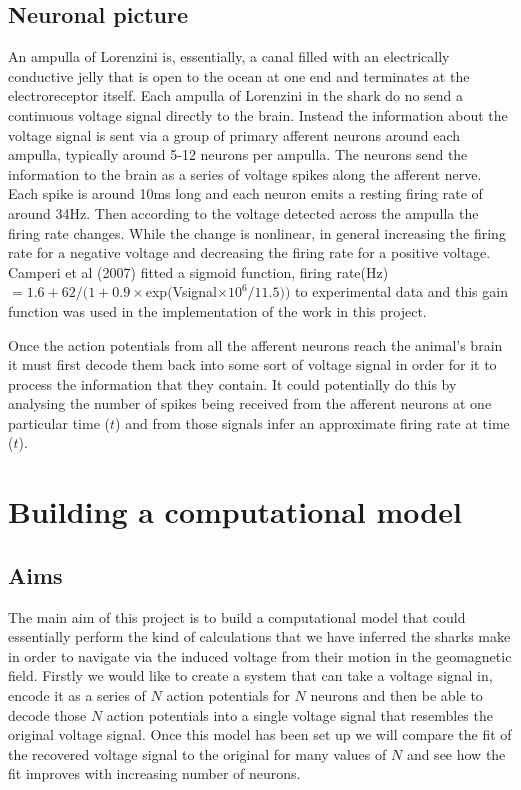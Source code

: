 \documentclass[12pt]{article}
\begin{document}
\subsection{Neuronal picture}
An ampulla of Lorenzini is, essentially, a canal filled with an electrically conductive jelly that is open to the ocean at one end and terminates at the electroreceptor itself. Each ampulla of Lorenzini in the shark do no send a continuous voltage signal directly to the brain. Instead the information about the voltage signal is sent via a group of primary afferent neurons around each ampulla, typically around 5-12 neurons per ampulla\cite{Murray:1974}. The neurons send the information to the brain as a series of voltage spikes along the afferent nerve. Each spike is around 10ms long and each neuron emits a resting firing rate of around 34Hz\cite{Camperi:2007}. Then according to the voltage detected across the ampulla the firing rate changes. While the change is nonlinear, in general increasing the firing rate for a negative voltage and decreasing the firing rate for a positive voltage. Camperi et al (2007) fitted a sigmoid function, firing rate(Hz)$ = 1.6 + 62/(1 + 0.9\times $exp$($Vsignal$\times 10^6/11.5))$ to experimental data and this gain function was used in the implementation of the work in this project.

Once the action potentials from all the afferent neurons reach the animal's brain it must first decode them back into some sort of voltage signal in order for it to process the information that they contain. It could potentially do this by analysing the number of spikes being received from the afferent neurons at one particular time ($t$) and from those signals infer an approximate firing rate at time ($t$).  

\section{Building a computational model}
\subsection{Aims}
The main aim of this project is to build a computational model that could essentially perform the kind of calculations that we have inferred the sharks make in order to navigate via the induced voltage from their motion in the geomagnetic field. Firstly we would like to create a system that can take a voltage signal in, encode it as a series of $N$ action potentials for $N$ neurons and then be able to decode those $N$ action potentials into a single voltage signal that resembles the original voltage signal. Once this model has been set up we will compare the fit of the recovered voltage signal to the original for many values of $N$ and see how the fit improves with increasing number of neurons. 
\end{document}
